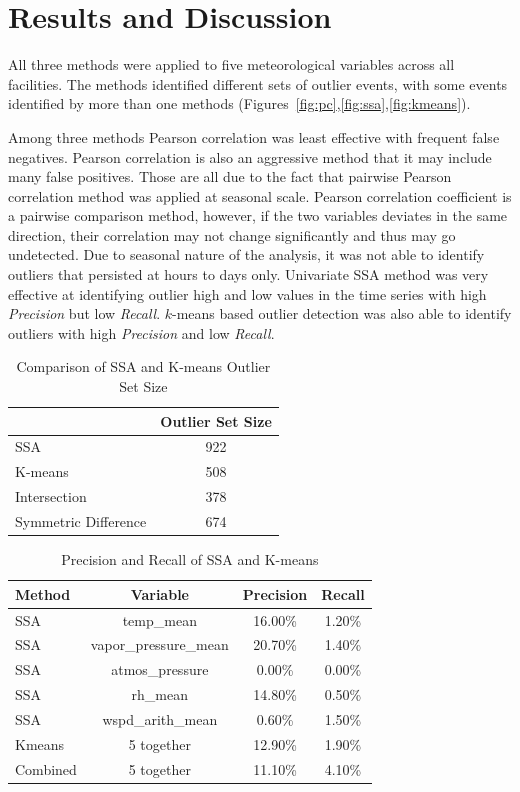 \section{Results and Discussion}
All three methods were applied to five meteorological variables across
all facilities. The methods identified different sets of outlier events,
with some events identified by more than one methods
(Figures~\ref{fig:pc},\ref{fig:ssa},\ref{fig:kmeans}).

Among three methods Pearson correlation was least effective with
frequent false negatives. Pearson correlation is also an aggressive method that
it may include many false positives. Those are all due to the fact 
that pairwise Pearson correlation method was applied at seasonal scale.
Pearson correlation coefficient is a pairwise comparison method, however, 
if the two variables deviates in the same direction, their correlation 
may not change significantly and thus may go undetected. Due to seasonal
nature of the analysis, it was not able to identify outliers that
persisted at hours to days only. Univariate SSA method was very effective 
at identifying outlier high and low values in the time series with high \textit{Precision} but low \textit{Recall}. 
$k$-means based outlier detection was also able to identify outliers
with high \textit{Precision} and low \textit{Recall}.

\begin{table}[ht]
\caption{Comparison of SSA and K-means Outlier Set Size}
\label{tab:comp}
\centering
\begin{tabular}{|l|c|}
\cline{2-2}
\multicolumn{1}{l|}{} & Outlier Set Size\\
\hline
SSA & 922\\
K-means & 508\\
Intersection & 378\\
Symmetric Difference & 674\\
\hline
\end{tabular}
\end{table}

\begin{table}[ht]
\caption{Precision and Recall of SSA and K-means}
\label{tab:pr}
\centering
\begin{tabular}{|l|c|c|c|}
\hline
Method & Variable & Precision & Recall\\
\hline
SSA & temp\_mean & 16.00\% & 1.20\%\\
SSA & vapor\_pressure\_mean & 20.70\% & 1.40\%\\
SSA & atmos\_pressure & 0.00\% & 0.00\%\\
SSA & rh\_mean & 14.80\% & 0.50\%\\
SSA & wspd\_arith\_mean & 0.60\% & 1.50\%\\
Kmeans & 5 together & 12.90\% & 1.90\%\\
Combined & 5 together & 11.10\% & 4.10\%\\
\hline
\end{tabular}
\end{table}

